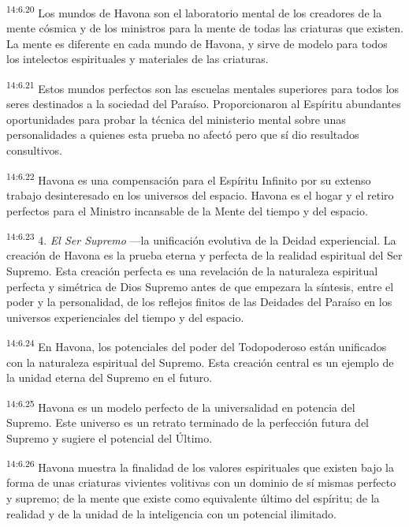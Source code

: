 \par
\textsuperscript{14:6.20} Los mundos de Havona son el laboratorio mental de los creadores de la mente cósmica y de los ministros para la mente de todas las criaturas que existen. La mente es diferente en cada mundo de Havona, y sirve de modelo para todos los intelectos espirituales y materiales de las criaturas.

\par
\textsuperscript{14:6.21} Estos mundos perfectos son las escuelas mentales superiores para todos los seres destinados a la sociedad del Paraíso. Proporcionaron al Espíritu abundantes oportunidades para probar la técnica del ministerio mental sobre unas personalidades a quienes esta prueba no afectó pero que sí dio resultados consultivos.

\par
\textsuperscript{14:6.22} Havona es una compensación para el Espíritu Infinito por su extenso trabajo desinteresado en los universos del espacio. Havona es el hogar y el retiro perfectos para el Ministro incansable de la Mente del tiempo y del espacio.

\par
\textsuperscript{14:6.23} 4. \textit{El Ser Supremo} ---la unificación evolutiva de la Deidad experiencial. La creación de Havona es la prueba eterna y perfecta de la realidad espiritual del Ser Supremo. Esta creación perfecta es una revelación de la naturaleza espiritual perfecta y simétrica de Dios Supremo antes de que empezara la síntesis, entre el poder y la personalidad, de los reflejos finitos de las Deidades del Paraíso en los universos experienciales del tiempo y del espacio.

\par
\textsuperscript{14:6.24} En Havona, los potenciales del poder del Todopoderoso están unificados con la naturaleza espiritual del Supremo. Esta creación central es un ejemplo de la unidad eterna del Supremo en el futuro.

\par
\textsuperscript{14:6.25} Havona es un modelo perfecto de la universalidad en potencia del Supremo. Este universo es un retrato terminado de la perfección futura del Supremo y sugiere el potencial del
Último.

\par
\textsuperscript{14:6.26} Havona muestra la finalidad de los valores espirituales que existen bajo la forma de unas criaturas vivientes volitivas con un dominio de sí mismas perfecto y supremo; de la mente que existe como equivalente último del espíritu; de la realidad y de la unidad de la inteligencia con un potencial ilimitado.

